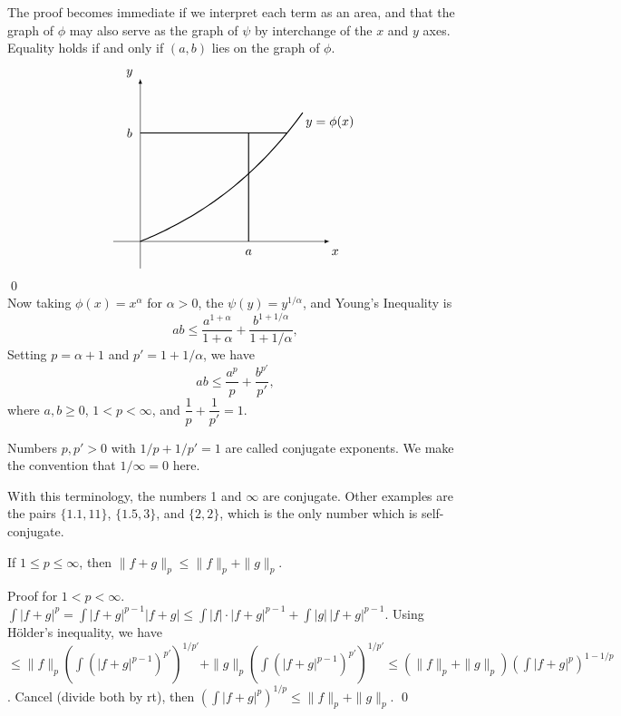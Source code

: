\pf The proof becomes immediate if we interpret each term as an area, and that the graph of $\phi$ may also serve as the graph of $\psi$ by interchange of the $x$ and $y$ axes. Equality holds if and only if $(a,b)$ lies on the graph of $\phi$. 
	\[
	\begin{tikzpicture}[scale=1.5,every node/.style={scale=1}]
	\node at (3.5,2.2) {$y=\phi(x)$}; 
	\node at (3.6, -0.2) {$x$};
	\node at (-0.2, 3.1) {$y$};
	\node at (2,-0.2) {$a$};
	\node at (-0.2,2) {$b$};

	\draw[thin,-latex] (-0.5,0) -- (3.5,0);
	\draw[thin,-latex] (0,-0.5) -- (0,3);
	\draw[thick,domain= 0:3,smooth,variable=\x] plot ({\x},{1.5^\x-1});
	\draw[thick, domain= 0:2,smooth,variable=\x] plot ({2},{\x});
	\draw[thick,domain= 0:2.70951,smooth,variable=\x] plot ({\x},{2});
	\end{tikzpicture}
	\] \qed \\


Now taking $\phi(x)= x^\alpha$ for $\alpha>0$, the $\psi(y)= y^{1/\alpha}$, and Young's Inequality is 
	\[
	ab \leq \dfrac{a^{1+\alpha}}{1+\alpha} + \dfrac{b^{1+1/\alpha}}{1+1/\alpha},
	\]
Setting $p= \alpha+1$ and $p'= 1+1/\alpha$, we have
	\[
	ab \leq \dfrac{a^p}{p} + \dfrac{b^{p'}}{p'}, 
	\]
where $a,b \geq 0$, $1<p<\infty$, and $\dfrac{1}{p} + \dfrac{1}{p'} = 1$.


\begin{dfn}
Numbers $p,p'>0$ with $1/p+1/p'=1$ are called conjugate exponents. We make the convention that $1/\infty=0$ here.
\end{dfn}


With this terminology, the numbers 1 and $\infty$ are conjugate. Other examples are the pairs $\{1.1,11\}$, $\{1.5,3\}$, and $\{2,2\}$, which is the only number which is self-conjugate. 












\begin{thm}
If $1 \leq p \leq \infty$, then $\|f+g\|_p \leq \|f\|_p + \|g\|_p$. 
\end{thm}

\pf Proof for $1<p<\infty$. $\int |f+g|^p= \int |f+g|^{p-1} |f+g| \leq \int |f| \cdot |f+g|^{p-1} + \int |g| \, |f+g|^{p-1}$. Using H\"older's inequality, we have $\leq \|f\|_p \left( \int (|f+g|^{p-1})^{p'} \right)^{1/p'} + \|g\|_p \left( \int (|f+g|^{p-1})^{p'}\right)^{1/p'} \leq (\|f\|_p + \|g\|_p) \left( \int |f+g|^p \right)^{1-1/p}$. Cancel (divide both by rt), then $\left( \int |f+g|^p \right)^{1/p} \leq \|f\|_p + \|g\|_p$. \qed \\



